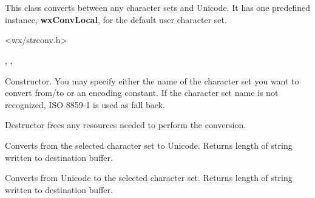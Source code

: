 %
%

\section{}\label{wxcsconv}

This class converts between any character sets and Unicode.
It has one predefined instance, {\bf wxConvLocal}, for the
default user character set.




<wx/strconv.h>


, 
, 


\label{wxcsconvwxcsconv}



Constructor. You may specify either the name of the character set you want to
convert from/to or an encoding constant. If the character set name is not
recognized, ISO 8859-1 is used as fall back.


\label{wxcsconvdtor}


Destructor frees any resources needed to perform the conversion.


\label{wxcsconvmb2wc}


Converts from the selected character set to Unicode. Returns length of string written to destination buffer.

\label{wxcsconvwc2mb}


Converts from Unicode to the selected character set. Returns length of string written to destination buffer.

